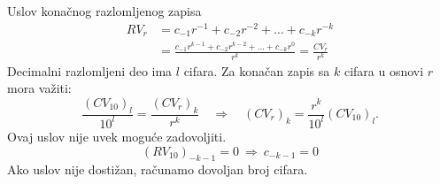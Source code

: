 \begin{frame}[label=04-s012]{Uslov konačnog razlomljenog zapisa}
\setlength{\abovedisplayskip}{3pt}\setlength{\belowdisplayskip}{3pt}
\[\begin{aligned}RV_r&=c_{-1}r^{-1}+c_{-2}r^{-2}+\ldots+c_{-k}r^{-k}\\
&=\frac{c_{-1}r^{k-1}+c_{-2}r^{k-2}+\ldots+c_{-k}r^0}{r^k}=\frac{CV_r}{r^k}\end{aligned}\]
Decimalni razlomljeni deo ima $l$ cifara. Za konačan zapis sa $k$ cifara u osnovi $r$ mora važiti:
\[\frac{(CV_{10})_l}{10^l}=\frac{(CV_r)_k}{r^k}\quad\Longrightarrow\quad(CV_r)_k=\frac{r^k}{10^l}(CV_{10})_l.\]
\alert{Ovaj uslov nije uvek moguće zadovoljiti.}
\[(RV_{10})_{-k-1}=0\ \Rightarrow\ c_{-k-1}=0\]
Ako uslov nije dostižan, računamo \alert{dovoljan broj cifara}.
\end{frame}
